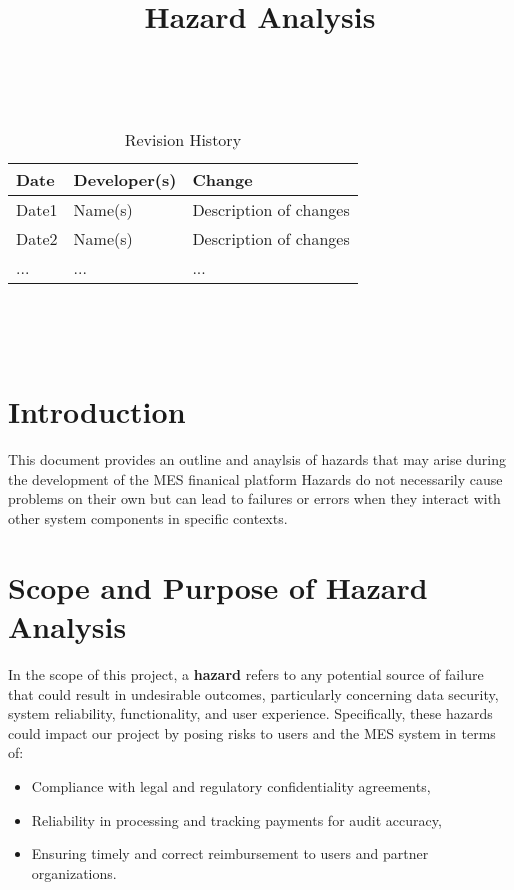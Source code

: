 \documentclass{article}
\title{Hazard Analysis\\\progname}
\author{\authname}
\date{}
\begin{document}
\maketitle
\thispagestyle{empty}

~\newpage


\begin{table}[hp]
\caption{Revision History} \label{TblRevisionHistory}
\begin{tabularx}{\textwidth}{llX}
\toprule
\textbf{Date} & \textbf{Developer(s)} & \textbf{Change}\\
\midrule
Date1 & Name(s) & Description of changes\\
Date2 & Name(s) & Description of changes\\
... & ... & ...\\
\bottomrule
\end{tabularx}
\end{table}

~\newpage

\tableofcontents

~\newpage



\section{Introduction}

This document provides an outline and anaylsis of hazards that may arise during the development of the MES finanical platform Hazards do not necessarily cause problems on their own but can lead to failures or errors when they interact with other system components in specific contexts.

\section{Scope and Purpose of Hazard Analysis}

In the scope of this project, a \textbf{hazard} refers to any potential source of failure that could result in undesirable outcomes, particularly concerning data security, system reliability, functionality, and user experience. Specifically, these hazards could impact our project by posing risks to users and the MES system in terms of:

\begin{itemize}
    \item Compliance with legal and regulatory confidentiality agreements,
    \item Reliability in processing and tracking payments for audit accuracy,
    \item Ensuring timely and correct reimbursement to users and partner organizations.
\end{itemize}
\end{document}
